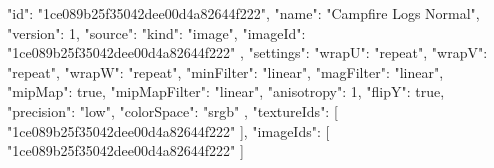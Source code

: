 {
  "id": "1ce089b25f35042dee00d4a82644f222",
  "name": "Campfire Logs Normal",
  "version": 1,
  "source": {
    "kind": "image",
    "imageId": "1ce089b25f35042dee00d4a82644f222"
  },
  "settings": {
    "wrapU": "repeat",
    "wrapV": "repeat",
    "wrapW": "repeat",
    "minFilter": "linear",
    "magFilter": "linear",
    "mipMap": true,
    "mipMapFilter": "linear",
    "anisotropy": 1,
    "flipY": true,
    "precision": "low",
    "colorSpace": "srgb"
  },
  "textureIds": [
    "1ce089b25f35042dee00d4a82644f222"
  ],
  "imageIds": [
    "1ce089b25f35042dee00d4a82644f222"
  ]
}
